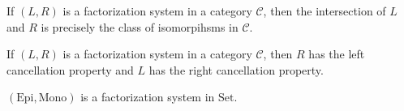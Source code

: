 \begin{lemma}
  If $(L,R)$ is a factorization system in a category $\mathcal{C}$, then the intersection of $L$ and $R$ is precisely the class of isomorpihsms in $\mathcal{C}$.
\end{lemma}

\begin{lemma}
  If $(L,R)$ is a factorization system in a category $\mathcal{C}$, then $R$ has the left cancellation property and $L$ has the right cancellation property.
\end{lemma}

\begin{lemma}
  $(\text{Epi},\text{Mono})$ is a factorization system in $\text{Set}$.
\end{lemma}